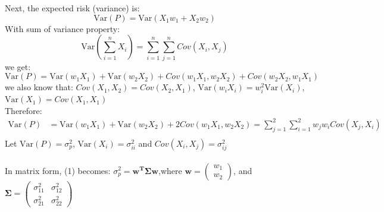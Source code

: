 \documentclass[12pt,titlepage,a4paper]{article}
\begin{document}
			Next, the expected risk (variance) is: 
			$$
				\mathrm{Var}(P) = \mathrm{Var}(X_1w_1 + X_2w_2)
			$$
			With sum of variance property: $$\mathrm{Var}(\sum_{i=1}^{n}{X_i}) = \sum_{i=1}^n\sum_{j=1}^{n}{Cov(X_i,X_j)}$$
			we get: 
			$$
				\mathrm{Var}(P) = \mathrm{Var}(w_1X_1)+\mathrm{Var}(w_2X_2)+Cov(w_1X_1,w_2X_2)+Cov(w_2X_2,w_1X_1)
			$$
			we also know that: $Cov(X_1,X_2) = Cov(X_2,X_1)$, $\mathrm{Var}(w_iX_i)=w_i^2\mathrm{Var}(X_i)$, $\mathrm{Var}(X_1)=Cov(X_1,X_1)$ \\
			Therefore: 
			\begin{equation}
				\begin{split}
				\mathrm{Var}(P) &= \mathrm{Var}(w_1X_1)+\mathrm{Var}(w_2X_2)+2Cov(w_1X_1,w_2X_2) = \sum_{j=1}^2{{\sum_{i=1}^2w_jw_iCov(X_j,X_i)}}\\
				\end{split}
			\end{equation}
			Let $\mathrm{Var}(P)=\sigma_p^2$, $\mathrm{Var}(X_i)=\sigma_{ii}^2$ and $Cov(X_i,X_j)=\sigma_{ij}^2$ \\ \\
			In matrix form, (1) becomes: $\sigma_p^2 = \mathbf{w^T\Sigma w}$,where $\mathbf{w} = \begin{pmatrix} w_1 \\ w_2 \end{pmatrix}$, and $\mathbf{\Sigma} = \begin{pmatrix}\sigma_{11}^2 & \sigma_{12}^2 \\ \sigma_{21}^2 & \sigma_{22}^2 \end{pmatrix}$ \\ \\
\end{document}
